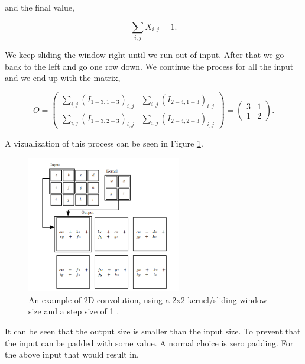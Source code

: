 \begin{description}
        and the final value,

        \begin{equation}
            \sum_{i,j} X_{i,j} = 1.
        \end{equation}

        We keep sliding the window right until we run out of input. After that
        we go back to the left and go one row down. We continue the process for
        all the input and we end up with the matrix,

        \begin{equation}
            O = \begin{pmatrix}
                \sum_{i,j} \left( I_{1-3,1-3} \right)_{i,j} &
                \sum_{i,j} \left( I_{2-4,1-3} \right)_{i,j} \\
                \sum_{i,j} \left( I_{1-3,2-3} \right)_{i,j} &
                \sum_{i,j} \left( I_{2-4,2-3} \right)_{i,j}
            \end{pmatrix} = \begin{pmatrix}
                3 & 1 \\
                1 & 2
            \end{pmatrix}.
        \end{equation}

        A vizualization of this process can be seen in Figure \ref{fig:ConvGen}.

        \begin{figure}
        \centering
        \includegraphics[width=0.6\textwidth]{./pictures/method/ConvGeneral.png}
        \caption{An example of 2D convolution, using a 2x2 kernel/sliding window
            size and a step size of 1 \citep{Goodfellow-et-al-2016}.}
        \label{fig:ConvGen}
        \end{figure}

        It can be seen that the output size is smaller than the input size. To
        prevent that the input can be padded with some value. A normal choice is
        zero padding. For the above input that would result in,


\end{description}
